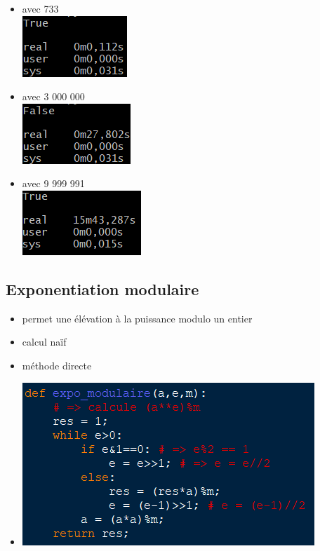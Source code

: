 \documentclass{beamer}
\begin{document}
\begin{frame}
\begin{itemize}
\item avec 733\\ \includegraphics[scale=1]{images/fermat1.png}
\item avec 3 000 000\\ \includegraphics[scale=1]{images/fermat4.png}
\item avec 9 999 991\\ \includegraphics[scale=1]{images/fermat5.png}
\end{itemize}
\end{frame}

\subsection{Exponentiation modulaire}
\begin{frame}
\begin{itemize}
\item permet une élévation à la puissance modulo un entier
\item calcul naïf
\item méthode directe
\end{itemize}
\end{frame}

\begin{frame}
\begin{itemize}
\item[] \includegraphics[scale=1]{images/expo_mod.png}
\end{itemize}
\end{frame}
\end{document}
